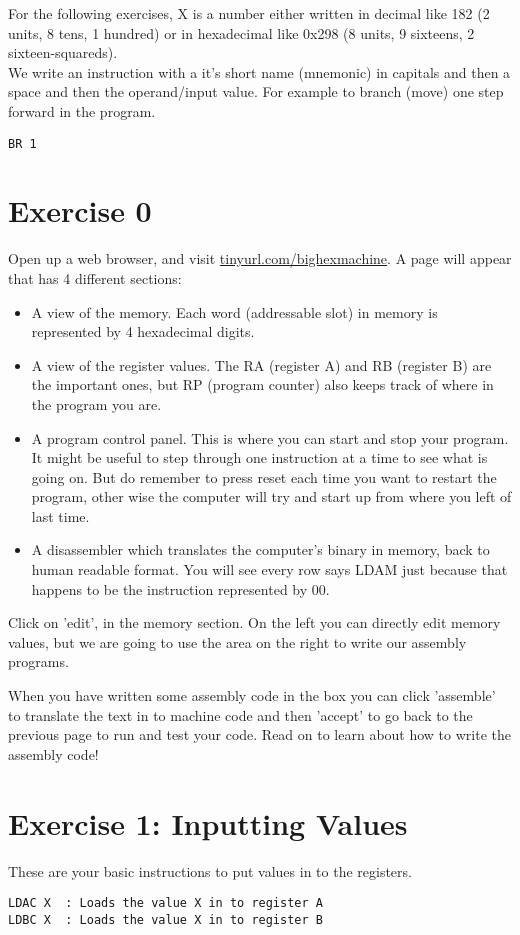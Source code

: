 \documentclass[10pt,a4paper]{article}
\begin{document}
For the following exercises, X is a number either written in decimal like 182 (2 units, 8 tens, 1 hundred) or in hexadecimal like 0x298 (8 units, 9 sixteens, 2 sixteen-squareds).\\

We write an instruction with a it's short name (mnemonic) in capitals and then a space and then the operand/input value. For example to branch (move) one step forward in the program.
\begin{lstlisting}[frame=single]
BR 1
\end{lstlisting}

\section{Exercise 0}
Open up a web browser, and visit \href{http://tinyurl.com/bighexmachine}{tinyurl.com/bighexmachine}. A page will appear  that has 4 different sections:
\begin{itemize}
\item A view of the memory. Each word (addressable slot) in memory is represented by  4 hexadecimal digits.
\item A view of the register values. The RA (register A) and RB (register B) are the important ones, but RP (program counter) also keeps track of where in the program you are.
\item A program control panel. This is where you can start and stop your program. It might be useful to step through one instruction at a time to see what is going on. But do remember to press reset each time you want to restart the program, other wise the computer will try and start up from where you left of last time.
\item A disassembler which translates the computer's binary in memory, back to human readable format. You will see every row says LDAM just because that happens to be the instruction represented by 00. 
\end{itemize}

Click on 'edit', in the memory section.
On the left you can directly edit memory values, but we are going to use the area on the right to write our assembly programs.

When you have written some assembly code in the box you can click 'assemble' to translate the text in to machine code and then 'accept' to go back to the previous page to run and test your code. Read on to learn about how to write the assembly code!

\section{Exercise 1: Inputting Values}
These are your basic instructions to put values in to the registers.
\begin{verbatim}
LDAC X	: Loads the value X in to register A
LDBC X	: Loads the value X in to register B
\end{verbatim}
\end{document}
